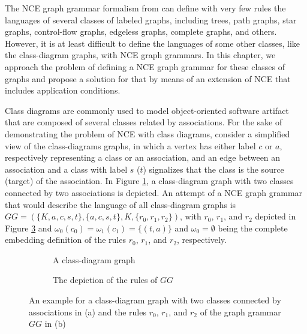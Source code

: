 \label{ch:pac-extension}
The NCE graph grammar formalism from \cite{janssens1982graph} can define with very few rules the languages of several classes of labeled graphs, including trees, path graphs, star graphs, control-flow graphs, edgeless graphs, complete graphs, and others. However, it is at least difficult to define the languages of some other classes, like the class-diagram graphs, with NCE graph grammars. In this chapter, we approach the problem of defining a NCE graph grammar for these classes of graphs and propose a solution for that by means of an extension of NCE that includes application conditions.

Class diagrams are commonly used to model object-oriented software artifact that are composed of several classes related by associations. For the sake of demonstrating the problem of NCE with class diagrams, consider a simplified view of the class-diagrams graphs, in which a vertex has either label $c$ or $a$, respectively representing a class or an association, and an edge between an association and a class with label $s$ ($t$) signalizes that the class is the source (target) of the association. In Figure \ref{fig:classdiagram-g}, a class-diagram graph with two classes connected by two associations is depicted. An attempt of a NCE graph grammar that would describe the language of all class-diagram graphs is $GG = (\{K,a,c,s,t\}, \{a,c,s,t\}, K, \{r_0, r_1, r_2\})$, with $r_0$, $r_1$, and $r_2$ depicted in Figure \ref{fig:classdiagram-gg} and $\omega_0(c_0) = \omega_1(c_1) = \{(t,a)\}$ and $\omega_0 = \emptyset$ being the complete embedding definition of the rules $r_0$, $r_1$, and $r_2$, respectively.

\begin{figure}[h]
	\begin{subfigure}[t]{0.5\textwidth}
		\centering
		
		\caption{A class-diagram graph}
		\label{fig:classdiagram-g}
	\end{subfigure}
	\begin{subfigure}[t]{0.49\textwidth}
		\centering
		
		\caption{The depiction of the rules of $GG$}
		\label{fig:classdiagram-gg}
	\end{subfigure}
	\caption{An example for a class-diagram graph with two classes connected by associations in (a) and the rules $r_0$, $r_1$, and $r_2$ of the graph grammar $GG$ in (b)}
\end{figure}

